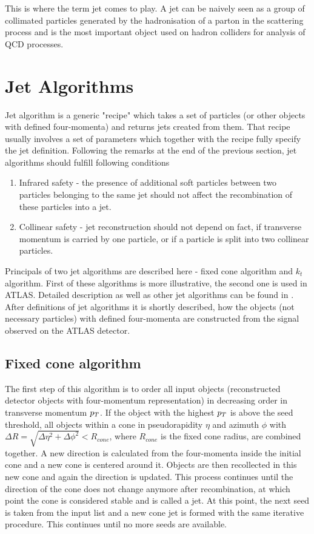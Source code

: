 This is where the term jet comes to play. A jet can be naively seen as a group
of collimated particles generated by the hadronisation of a parton in the
scattering process and is the most important object used on hadron colliders for
analysis of QCD processes.

\section{Jet Algorithms}

Jet algorithm is a generic "recipe" which takes a set of particles (or other
objects with defined
four-momenta) and returns jets created from them. That recipe usually involves a
set of parameters which together with the recipe fully specify the jet
definition. Following the remarks at the end of the previous section, jet
algorithms should fulfill following conditions 
\begin{enumerate}
  \item Infrared safety - the presence of additional soft particles between two
    particles belonging to the same jet should not affect the recombination of
    these particles into a jet.
  \item Collinear safety - jet reconstruction should not depend on fact, if
    transverse momentum is carried by one particle, or if a particle is split
    into two collinear particles.
\end{enumerate}

Principals of two jet algorithms are described here - fixed cone algorithm and
$k_t$ algorithm. First of these algorithms is more illustrative, the second one
is used in ATLAS. Detailed description as well as other jet algorithms can be
found in \cite{ATLASmain}. After definitions of jet algorithms it is shortly
described, how the objects (not necessary particles) with defined four-momenta
are constructed from the signal observed on the ATLAS detector.

\subsection{Fixed cone algorithm}

The first step of this algorithm is to order all input objects (reconstructed
detector objects with four-momentum representation) in decreasing order in
transverse momentum $p_{T}$. If the object with the highest $p_{T}$ is above the
seed threshold, all objects within a cone in pseudorapidity $\eta$ and azimuth
$\phi$ with $\Delta R = \sqrt{\Delta \eta^2 + \Delta \phi^2} < R_{cone}$, where
$R_{cone}$ is the fixed cone radius, are combined together. A new direction is
calculated from the four-momenta inside the initial cone and a new cone is
centered around it. Objects are then recollected in this new cone and again the
direction is updated. This process continues until the direction of the cone
does not change anymore after recombination, at which point the cone is
considered stable and is called a jet. At this point, the next seed is taken
from the input list and a new cone jet is formed with the same iterative
procedure. This continues until no more seeds are available. 

